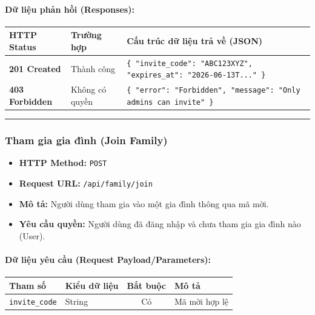 \documentclass[12pt,a4paper]{article}
\begin{document}
\paragraph{Dữ liệu phản hồi (Responses):}
\begin{longtable}{|>{\raggedright\arraybackslash}p{2.8cm}|>{\raggedright\arraybackslash}p{3.2cm}|>{\raggedright\arraybackslash}p{8.0cm}|}
\hline
\textbf{HTTP Status} & \textbf{Trường hợp} & \textbf{Cấu trúc dữ liệu trả về (JSON)} \\ \hline
\endhead
\textbf{201 Created} & Thành công & \texttt{\{ "invite\_code": "ABC123XYZ", "expires\_at": "2026-06-13T..." \}} \\ \hline
\textbf{403 Forbidden} & Không có quyền & \texttt{\{ "error": "Forbidden", "message": "Only admins can invite" \}} \\ \hline
\end{longtable}

\vskip 0.4cm
\noindent\rule{\textwidth}{0.3pt}
\vskip 0.4cm

\subsubsection{Tham gia gia đình (Join Family)}
\begin{itemize}[leftmargin=*]
    \item \textbf{HTTP Method:} \texttt{POST}
    \item \textbf{Request URL:} \texttt{/api/family/join}
    \item \textbf{Mô tả:} Người dùng tham gia vào một gia đình thông qua mã mời.
    \item \textbf{Yêu cầu quyền:} Người dùng đã đăng nhập và chưa tham gia gia đình nào (User).
\end{itemize}

\paragraph{Dữ liệu yêu cầu (Request Payload/Parameters):}
\begin{longtable}{|>{\raggedright\arraybackslash}p{2.8cm}|>{\raggedright\arraybackslash}p{2.2cm}|c|>{\raggedright\arraybackslash}p{7.0cm}|}
\hline
\textbf{Tham số} & \textbf{Kiểu dữ liệu} & \textbf{Bắt buộc} & \textbf{Mô tả} \\ \hline
\endhead
\texttt{invite\_code} & String & Có & Mã mời hợp lệ \\ \hline
\end{longtable}
\end{document}
